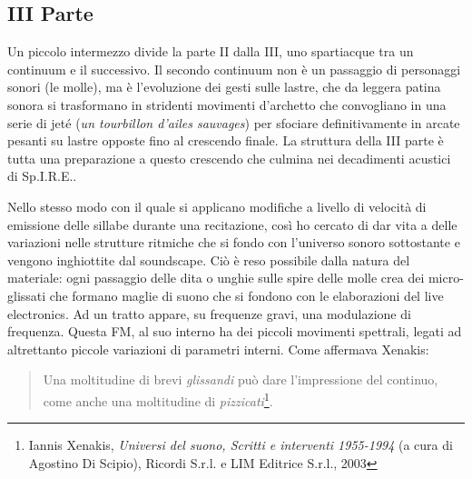 \subsection*{III Parte}

Un piccolo intermezzo divide la parte II dalla III, uno spartiacque tra un continuum  e il successivo. Il secondo continuum non è un passaggio di personaggi sonori (le molle), ma è l'evoluzione dei gesti sulle lastre, che da leggera patina sonora si trasformano in stridenti movimenti d'archetto che convogliano in una serie di jeté (\textit{un tourbillon d'ailes sauvages}) per sfociare definitivamente in arcate pesanti su lastre opposte fino al crescendo finale. La struttura della III parte è tutta una preparazione a questo crescendo che culmina nei decadimenti acustici di Sp.I.R.E..


Nello stesso modo con il quale si applicano modifiche a livello di velocità di emissione delle sillabe durante una recitazione, così ho cercato di dar vita a delle variazioni nelle strutture ritmiche che si fondo con l'universo sonoro sottostante e vengono inghiottite dal soundscape. Ciò è reso possibile dalla natura del materiale: ogni passaggio delle dita o unghie sulle spire delle molle crea dei micro-glissati che formano maglie di suono che si fondono con le elaborazioni del live electronics. Ad un tratto appare, su frequenze gravi, una modulazione di frequenza. Questa FM, al suo interno ha dei piccoli movimenti spettrali, legati ad altrettanto piccole variazioni di parametri interni. Come affermava Xenakis:

\begin{quotation}
Una moltitudine di brevi \textit{glissandi} può dare l'impressione del continuo, come anche una moltitudine di \textit{pizzicati}\footnote{Iannis Xenakis, \textit{Universi del suono, Scritti e interventi 1955-1994} (a cura di Agostino Di Scipio), Ricordi S.r.l. e LIM Editrice S.r.l., 2003}.
\end{quotation}

